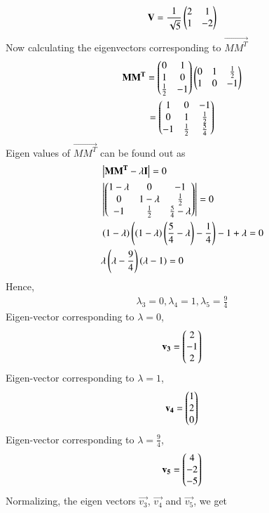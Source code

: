 \documentclass[journal,12pt,twocolumn]{IEEEtran}
\begin{document}
\begin{align}
	\mathbf{V} = \frac{1}{\sqrt{5}}\begin{pmatrix}2 & 1 \\ 1 & -2 \end{pmatrix} \label{5}
\end{align}
Now calculating the eigenvectors corresponding to $\vec{MM^T}$
\begin{multline}
\mathbf{MM^T} = \begin{pmatrix}0 & 1 \\ 1 & 0 \\ \frac{1}{2} & -1\end{pmatrix}\begin{pmatrix}0 & 1 & \frac{1}{2} \\ 1 & 0 &-1 \end{pmatrix} \\ =
\begin{pmatrix}1 & 0 &-1 \\ 0 & 1 & \frac{1}{2} \\ -1 & \frac{1}{2} & \frac{5}{4}\end{pmatrix}
\end{multline}
Eigen values of $\vec{MM^T}$ can be found out as
\begin{align}
	& \left\vert\mathbf{MM^T-\lambda I}\right\vert = 0 \\
	& \left\vert\begin{pmatrix}1-\lambda & 0 & -1 \\ 0 & 1-\lambda & \frac{1}{2} \\ -1 & \frac{1}{2} & \frac{5}{4}-\lambda\end{pmatrix}\right\vert = 0 \\
	& \left(1-\lambda\right)\left(\left(1-\lambda\right)\left(\frac{5}{4}-\lambda\right)-\frac{1}{4}\right)
	-1+\lambda = 0 \\
	& \lambda\left(\lambda-\frac{9}{4}\right)\left(\lambda-1\right) = 0  
\end{align}
Hence,
\begin{align}
\lambda_3 = 0, \lambda_4 = 1, \lambda_5=\frac{9}{4}
\end{align}
Eigen-vector corresponding to $\lambda=0$,
\begin{align}
	\mathbf{v_3} = \begin{pmatrix}2 \\ -1 \\ 2\end{pmatrix}
\end{align}
Eigen-vector corresponding to $\lambda=1$,
\begin{align}
	\mathbf{v_4} = \begin{pmatrix}1 \\ 2 \\ 0\end{pmatrix}
\end{align}
Eigen-vector corresponding to $\lambda=\frac{9}{4}$,
\begin{align}
	\mathbf{v_5} = \begin{pmatrix}4 \\ -2 \\ -5\end{pmatrix}
\end{align}
Normalizing, the eigen vectors $\vec{v_3}$, $\vec{v_4}$ and $\vec{v_5}$, we get
\end{document}
